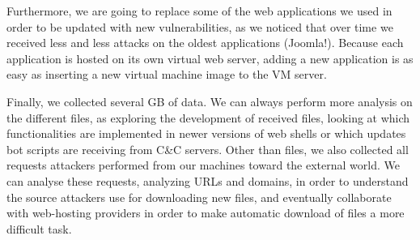 Furthermore, we are going to replace some of the web applications we used in order to be updated with new vulnerabilities, as we noticed that over time we received less and less attacks on the oldest applications (Joomla!). Because each application is hosted on its own virtual web server, adding a new application is as easy as inserting a new virtual machine image to the VM server.

Finally, we collected several GB of data. We can always perform more analysis on the different files, as exploring the development of received files, looking at which functionalities are implemented in newer versions of web shells or which updates bot scripts are receiving from C\&C servers. Other than files, we also collected all requests attackers performed from our machines toward the external world. We can analyse these requests, analyzing URLs and domains, in order to understand the source attackers use for downloading new files, and eventually collaborate with web-hosting providers in order to make automatic download of files a more difficult task.

